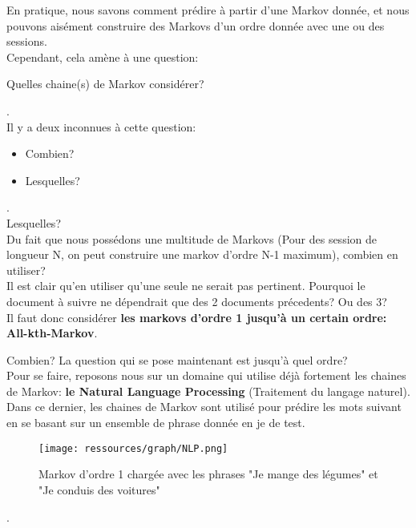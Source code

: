             En pratique, nous savons comment prédire à partir d'une Markov donnée, et nous pouvons aisément construire des Markovs d'un ordre donnée avec une ou des sessions.\\
            Cependant, cela amène à une question:
            \begin{center}
                Quelles chaine(s) de Markov considérer?
            \end{center}.\\

            Il y a deux inconnues à cette question:
            \begin{itemize}
                \item Combien?
                \item Lesquelles?
            \end{itemize}.\\

            \large{Lesquelles?}\\
            \normalsize
            Du fait que nous possédons une multitude de Markovs (Pour des session de longueur N, on peut construire une markov d'ordre N-1 maximum), combien en utiliser?\\
            Il est clair qu'en utiliser qu'une seule ne serait pas pertinent. Pourquoi le document à suivre ne dépendrait que des 2 documents précedents? Ou des 3?\\
            Il faut donc considérer \textbf{les markovs d'ordre 1 jusqu'à un certain ordre: All-kth-Markov}.

            \large{Combien?}
            \normalsize
            La question qui se pose maintenant est jusqu'à quel ordre?\\
            Pour se faire, reposons nous sur un domaine qui utilise déjà fortement les chaines de Markov: \textbf{le Natural Language Processing} (Traitement du langage naturel).\\
            Dans ce dernier, les chaines de Markov sont utilisé pour prédire les mots suivant en se basant sur un ensemble de phrase donnée en je de test.

            \begin{figure}[h]
               \centering
               \texttt{[image: ressources/graph/NLP.png]}
               \caption{Markov d'ordre 1 chargée avec les phrases "Je mange des légumes" et "Je conduis des voitures"}
            \end{figure}.\\

